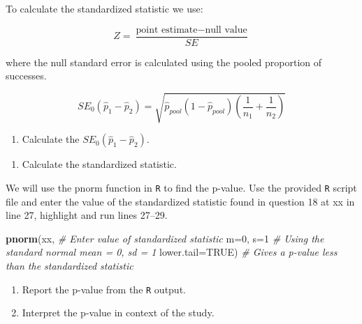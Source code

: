 \documentclass[
]{report}
\newenvironment{Shaded}{\begin{snugshade}}{\end{snugshade}}
\newcommand{\CommentTok}[1]{\textcolor[rgb]{0.56,0.35,0.01}{\textit{#1}}}
\newcommand{\DataTypeTok}[1]{\textcolor[rgb]{0.13,0.29,0.53}{#1}}
\newcommand{\DecValTok}[1]{\textcolor[rgb]{0.00,0.00,0.81}{#1}}
\newcommand{\KeywordTok}[1]{\textcolor[rgb]{0.13,0.29,0.53}{\textbf{#1}}}
\newcommand{\NormalTok}[1]{#1}
\newcommand{\OtherTok}[1]{\textcolor[rgb]{0.56,0.35,0.01}{#1}}
\providecommand{\tightlist}{%
  \setlength{\itemsep}{0pt}\setlength{\parskip}{0pt}}
\begin{document}
\vspace{1in}

To calculate the standardized statistic we use:

\[
Z = \frac{\text{point estimate} - \text{null value}}{SE}
\]

where the null standard error is calculated using the pooled proportion of successes.

\[
SE_0(\hat{p}_1-\hat{p}_2)=\sqrt{\hat{p}_{pool}(1-\hat{p}_{pool})(\frac{1}{n_1}+\frac{1}{n_2})}
\]

\vspace{.25in}

\begin{enumerate}
\def\labelenumi{\arabic{enumi}.}
\setcounter{enumi}{16}
\tightlist
\item
  Calculate the \(SE_0(\hat{p}_1-\hat{p}_2)\).
\end{enumerate}

\vspace{1in}

\begin{enumerate}
\def\labelenumi{\arabic{enumi}.}
\setcounter{enumi}{17}
\tightlist
\item
  Calculate the standardized statistic.
\end{enumerate}

\vspace{1in}

We will use the pnorm function in \texttt{R} to find the p-value. Use the provided \texttt{R} script file and enter the value of the standardized statistic found in question 18 at xx in line 27, highlight and run lines 27--29.

\begin{Shaded}
\begin{Highlighting}[]
\KeywordTok{pnorm}\NormalTok{(xx, }\CommentTok{\# Enter value of standardized statistic}
      \DataTypeTok{m=}\DecValTok{0}\NormalTok{, }\DataTypeTok{s=}\DecValTok{1} \CommentTok{\# Using the standard normal mean = 0, sd = 1}
      \DataTypeTok{lower.tail=}\OtherTok{TRUE}\NormalTok{) }\CommentTok{\# Gives a p{-}value less than the standardized statistic}
\end{Highlighting}
\end{Shaded}

\begin{enumerate}
\def\labelenumi{\arabic{enumi}.}
\setcounter{enumi}{18}
\item
  Report the p-value from the \texttt{R} output.
  \vspace{0.2in}
\item
  Interpret the p-value in context of the study.
\end{enumerate}
\end{document}
